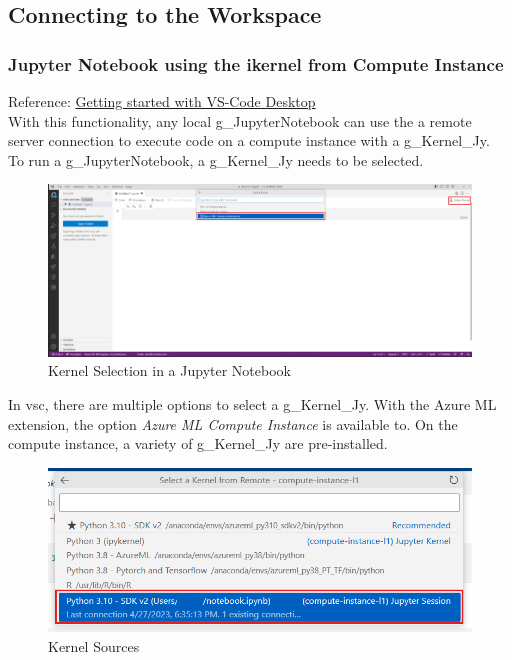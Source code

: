\subsection{Connecting to the Workspace}
\subsubsection{Jupyter Notebook using the ikernel from Compute Instance}
Reference: \href{https://learn.microsoft.com/de-de/azure/machine-learning/how-to-launch-vs-code-remote?view=azureml-api-2&tabs=vscode-desktop}{Getting started with VS-Code Desktop}\\

With this functionality, any local \gls{g_JupyterNotebook} can use the a remote server connection to execute code on a compute instance with a \gls{g_Kernel_Jy}.\\

To run a \gls{g_JupyterNotebook}, a \gls{g_Kernel_Jy} needs to be selected.

\begin{figure}[H]
	\centering
	\includegraphics[scale = 0.3]{attachment/chapter_AML/Scc015}
	\caption{Kernel Selection in a Jupyter Notebook}
\end{figure}

In \gls{vsc}, there are multiple options to select a \gls{g_Kernel_Jy}. With the Azure ML extension, the option \textit{Azure ML Compute Instance} is available to.  On the compute instance, a variety of \gls{g_Kernel_Jy} are pre-installed.
\begin{figure}[H]
	\centering
	\includegraphics[scale = 0.3]{attachment/chapter_AML/Scc016}
	\caption{Kernel Sources}
\end{figure}

